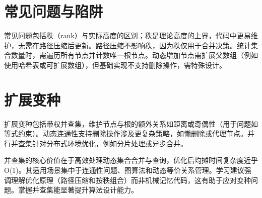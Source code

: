 \chapter{常见问题与陷阱}
常见问题包括秩（rank）与实际高度的区别；秩是理论高度的上界，代码中更易维护，无需在路径压缩后更新。路径压缩不影响秩，因为秩仅用于合并决策。统计集合数量时，需遍历所有节点并计数唯一根节点。动态增加节点需扩展父数组（例如使用哈希表或可扩展数组），但基础实现不支持删除操作，需特殊设计。\par
\chapter{扩展变种}
扩展变种包括带权并查集，维护节点与根的额外关系如距离或奇偶性（用于问题如等式约束）。动态连通性支持删除操作涉及更复杂策略，如懒删除或代理节点。并行并查集针对分布式环境优化，例如分片处理或异步合并。\par
并查集的核心价值在于高效处理动态集合合并与查询，优化后均摊时间复杂度近乎 O(1)。其适用场景集中于连通性问题、图算法和动态等价关系管理。学习建议强调理解优化原理（路径压缩和按秩组合）而非机械记忆代码，这有助于应对变种问题。掌握并查集能显著提升算法设计能力。\par
